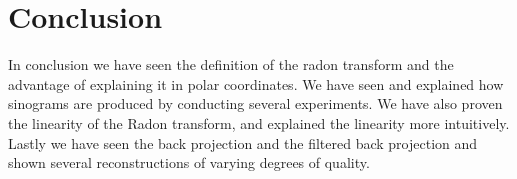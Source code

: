 \section{Conclusion}
In conclusion we have seen the definition of the radon transform and the advantage of explaining it in polar coordinates. We have seen and explained how sinograms are produced by conducting several experiments. We have also proven the linearity of the Radon transform, and explained the linearity more intuitively. Lastly we have seen the back projection and the filtered back projection and shown several reconstructions of varying degrees of quality.